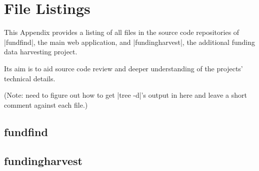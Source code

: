 \chapter{File Listings}
\label{file-listings}

This Appendix provides a listing of all files in the source code repositories of |fundfind|, the main web application, and |fundingharvest|, the additional funding data harvesting project.

Its aim is to aid source code review and deeper understanding of the projects' technical details.

(Note: need to figure out how to get |tree -d|'s output in here and leave a short comment against each file.)

\section{fundfind}

\section{fundingharvest}